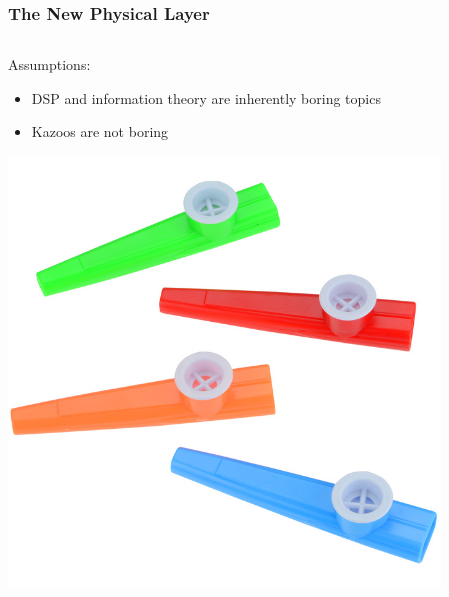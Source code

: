 \documentclass[
	11pt, %
]{beamer}
\begin{document}

\begin{frame}
  \frametitle{The New Physical Layer}

  \begin{columns}[c] %
    \begin{column}{0.4\textwidth} %
      Assumptions:
      \begin{itemize}
        \item DSP and information theory are inherently boring topics
        \item Kazoos are not boring
      \end{itemize}
      \begin{center}
        \includegraphics[width=0.6\linewidth]{kazoos.png}
      \end{center}
    \end{column}
    \begin{column}{0.4\textwidth} %
      \begin{center}
        \begin{figure}

\end{figure}
\end{center}
\end{column}
\end{columns}
\end{frame}
\end{document}

